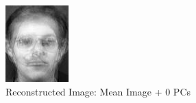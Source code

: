 \documentclass[12pt]{article}
\begin{document}
\begin{figure}
	\centering
	\begin{subfigure}[b]{0.20\textwidth}
		\includegraphics[width=\textwidth]{Task4.6_Images/ReconstructedImage0.jpg}
		\caption{Reconstructed Image: Mean Image + 0 PCs}
	\end{subfigure}\quad
	\begin{subfigure}[b]{0.20\textwidth}

\end{subfigure}
\end{figure}
\end{document}
